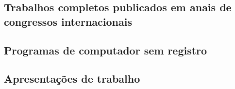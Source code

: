 \subsection{Trabalhos completos publicados em anais de congressos internacionais}





\subsection{Programas de computador sem registro}










\subsection{Apresentações de trabalho}







